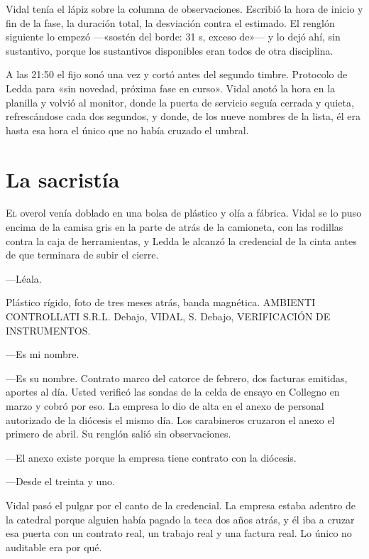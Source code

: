 Vidal tenía el lápiz sobre la columna de observaciones. Escribió la hora de inicio y fin de la fase, la duración total, la desviación contra el estimado. El renglón siguiente lo empezó ---«sostén del borde: 31 s, exceso de»--- y lo dejó ahí, sin sustantivo, porque los sustantivos disponibles eran todos de otra disciplina.

A las 21:50 el fijo sonó una vez y cortó antes del segundo timbre. Protocolo de Ledda para «sin novedad, próxima fase en curso». Vidal anotó la hora en la planilla y volvió al monitor, donde la puerta de servicio seguía cerrada y quieta, refrescándose cada dos segundos, y donde, de los nueve nombres de la lista, él era hasta esa hora el único que no había cruzado el umbral.

\clearpage

\chapter{La sacristía}

\lettrine[lines=2, lhang=0.1, nindent=0.2em]{E}{l} overol venía doblado en una bolsa de plástico y olía a fábrica. Vidal se lo puso encima de la camisa gris en la parte de atrás de la camioneta, con las rodillas contra la caja de herramientas, y Ledda le alcanzó la credencial de la cinta antes de que terminara de subir el cierre.


---Léala.

Plástico rígido, foto de tres meses atrás, banda magnética. AMBIENTI CONTROLLATI S.R.L. Debajo, VIDAL, S. Debajo, VERIFICACIÓN DE INSTRUMENTOS.

---Es mi nombre.

---Es su nombre. Contrato marco del catorce de febrero, dos facturas emitidas, aportes al día. Usted verificó las sondas de la celda de ensayo en Collegno en marzo y cobró por eso. La empresa lo dio de alta en el anexo de personal autorizado de la diócesis el mismo día. Los carabineros cruzaron el anexo el primero de abril. Su renglón salió sin observaciones.

---El anexo existe porque la empresa tiene contrato con la diócesis.

---Desde el treinta y uno.

Vidal pasó el pulgar por el canto de la credencial. La empresa estaba adentro de la catedral porque alguien había pagado la teca dos años atrás, y él iba a cruzar esa puerta con un contrato real, un trabajo real y una factura real. Lo único no auditable era por qué.

